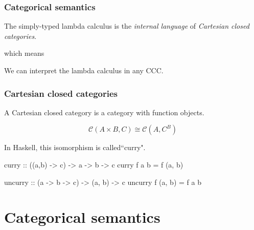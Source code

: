 \documentclass[
  xcolor={usenames,dvipsnames,svgnames},
  ]{beamer}
\begin{document}
\begin{frame}
  \frametitle{Categorical semantics}
  The simply-typed lambda calculus is the \textit{internal language} of \textit{Cartesian closed categories}.

  which means

  We can interpret the lambda calculus in any CCC.
\end{frame}

\begin{frame}[fragile]
\frametitle{Cartesian closed categories}
A Cartesian closed category is a category with function objects.

$$
\mathcal{C}(A \times B, C) \cong \mathcal{C}(A, C^B)
$$

In Haskell, this isomorphism is called``curry".

\begin{code}
curry :: ((a,b) -> c) -> a -> b -> c
curry f a b = f (a, b)

uncurry :: (a -> b -> c) -> (a, b) -> c
uncurry f (a, b) = f a b
\end{code}

\end{frame}


\section{Categorical semantics}
\end{document}
